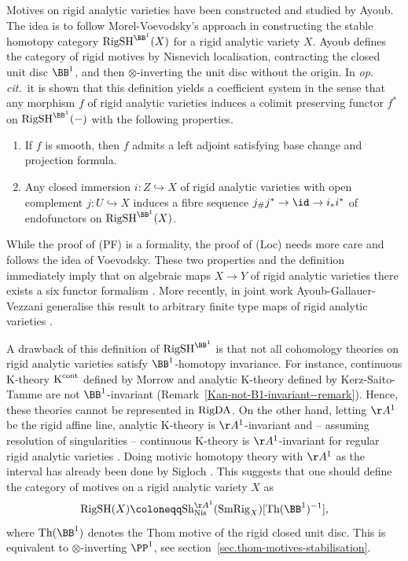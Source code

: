 \documentclass[colorinlistoftodos,article,11pt,reqno]{article}
\newcommand{\RigSH}{\textup{RigSH}}
\newcommand{\SmRig}{\textup{SmRig}}
\newcommand{\Sh}{\textup{Sh}}
\newcommand{\Nis}{\textup{Nis}}
\newcommand{\K}{\textup{K}}
\newcommand{\Kcont}{\K^\textup{cont}}
\newcommand{\Arig}{\AA^{1}}
\newcommand{\Brig}{\BB^{1}}
\renewcommand{\to}[1][]{\overset{#1}{\rightarrow}}
\begin{document}
\vspace{6pt}\noindent Motives on rigid analytic varieties have been constructed and studied by Ayoub\linebreak \cite{AyoubRig}. The idea is to follow Morel-Voevodsky's approach in constructing the stable homotopy category $\textup{RigSH}^{\Brig}(X)$ for a rigid analytic variety $X$. Ayoub defines the category of rigid motives by Nisnevich localisation, contracting the closed unit disc $\Brig$, and then $\otimes$-inverting the unit disc without the origin. In \textit{op.\!\! cit.}\ it is shown that this definition yields a coefficient system in the sense that any morphism $f$ of rigid analytic varieties induces a colimit preserving functor $f^*$ on $\textup{RigSH}^{\Brig}(-)$ with the following properties.
\begin{enumerate}
    \item[(PF)] If $f$ is smooth, then $f$ admits a left adjoint satisfying base change and projection formula.
    \item[(Loc)] Any closed immersion $i\colon Z\hookrightarrow X$ of rigid analytic varieties with open complement $j \colon U\hookrightarrow X$ induces a fibre sequence $j_\#j^* \to \id \to i_*i^*$ of endofunctors on $\textup{RigSH}^{\Brig}(X)$.
\end{enumerate}
 While the proof of (PF) is a formality, the proof of (Loc) needs more care and follows the idea of Voevodsky. These two properties and the definition immediately imply that on algebraic maps $X\rightarrow Y$ of rigid analytic varieties there exists a six functor formalism \cite[Scholie 1.4.2]{AyoubThesis}. More recently, in joint work Ayoub-Gallauer-Vezzani generalise this result to arbitrary finite type maps of rigid analytic varieties \cite{AGV}.
\par
A drawback of this definition of $\textup{RigSH}^{\Brig}$ is that not all cohomology theories on rigid analytic varieties satisfy $\Brig$-homotopy invariance. For instance, continuous K-theory $\Kcont$ defined by Morrow \cite{Morrow}  and analytic K-theory defined by Kerz-Saito-Tamme \cite{kst-i} are not $\Brig$-invariant (Remark~\ref{Kan-not-B1-invariant--remark}). Hence, these theories cannot be represented in $\textup{RigDA}$. On the other hand, letting $\Arig$ be the rigid affine line, analytic K-theory is $\Arig$-invariant \cite[Cor.~2.7]{kst-ii} and  -- assuming resolution of singularities -- continuous K-theory is $\Arig$-invariant for regular rigid analytic varieties \cite[Prop. 5.14]{kst-i}.
Doing motivic homotopy theory with $\Arig$ as the interval has already been done by Sigloch \cite{sigloch-thesis}.
This suggests that one should define the category of motives on a rigid analytic variety $X$ as 
\[
    \RigSH(X)\coloneqq \Sh_{\Nis}^{\AA^1}(\SmRig_{X})[\textup{Th}(\Brig)^{-1}],
\]
where $\textup{Th}(\Brig)$ denotes the Thom motive of the rigid closed unit disc. This is equivalent to $\otimes$-inverting $\PP^1$, see section~\ref{sec.thom-motives-stabilisation}.
\end{document}
